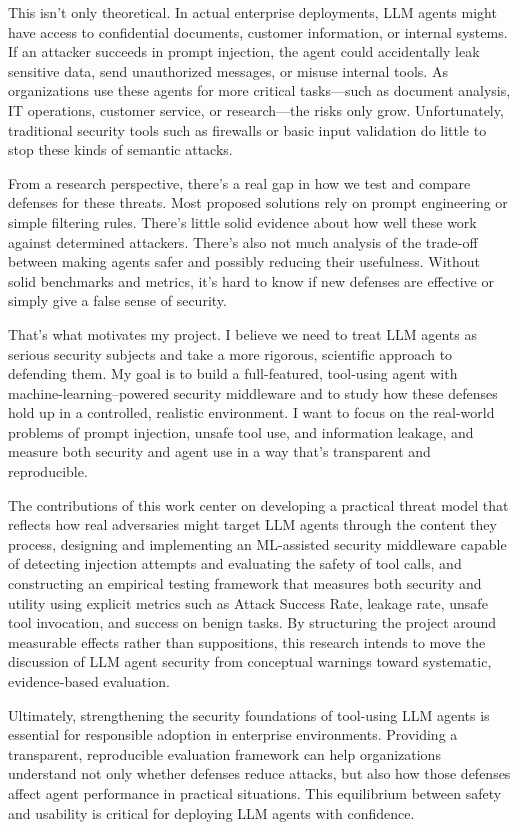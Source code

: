 \documentclass[11pt]{article}
\begin{document}
This isn't only theoretical. In actual enterprise deployments, LLM agents might have access to confidential documents, customer information, or internal systems. If an attacker succeeds in prompt injection, the agent could accidentally leak sensitive data, send unauthorized messages, or misuse internal tools. As organizations use these agents for more critical tasks---such as document analysis, IT operations, customer service, or research---the risks only grow. Unfortunately, traditional security tools such as firewalls or basic input validation do little to stop these kinds of semantic attacks.

From a research perspective, there's a real gap in how we test and compare defenses for these threats. Most proposed solutions rely on prompt engineering or simple filtering rules. There's little solid evidence about how well these work against determined attackers. There's also not much analysis of the trade-off between making agents safer and possibly reducing their usefulness. Without solid benchmarks and metrics, it's hard to know if new defenses are effective or simply give a false sense of security.

That's what motivates my project. I believe we need to treat LLM agents as serious security subjects and take a more rigorous, scientific approach to defending them. My goal is to build a full-featured, tool-using agent with machine-learning--powered security middleware and to study how these defenses hold up in a controlled, realistic environment. I want to focus on the real-world problems of prompt injection, unsafe tool use, and information leakage, and measure both security and agent use in a way that's transparent and reproducible.

The contributions of this work center on developing a practical threat model that reflects how real adversaries might target LLM agents through the content they process, designing and implementing an ML-assisted security middleware capable of detecting injection attempts and evaluating the safety of tool calls, and constructing an empirical testing framework that measures both security and utility using explicit metrics such as Attack Success Rate, leakage rate, unsafe tool invocation, and success on benign tasks. By structuring the project around measurable effects rather than suppositions, this research intends to move the discussion of LLM agent security from conceptual warnings toward systematic, evidence-based evaluation.

Ultimately, strengthening the security foundations of tool-using LLM agents is essential for responsible adoption in enterprise environments. Providing a transparent, reproducible evaluation framework can help organizations understand not only whether defenses reduce attacks, but also how those defenses affect agent performance in practical situations. This equilibrium between safety and usability is critical for deploying LLM agents with confidence.
\end{document}
